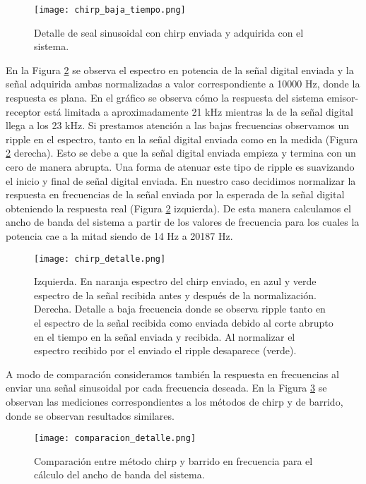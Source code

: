 \documentclass[a4paper, 11pt]{article}
\begin{document}
\begin{figure} [H]
\centering
\texttt{[image: chirp\_baja\_tiempo.png]}
\caption{Detalle de seal sinusoidal con chirp enviada y adquirida con el sistema.\label{fig:chirp}}
\end{figure}
En la Figura \ref{fig:chirp_detalle} se observa el espectro en potencia de la señal digital enviada y la señal adquirida ambas normalizadas a valor correspondiente a 10000 Hz, donde la respuesta es plana. En el gráfico se observa cómo la respuesta del sistema emisor-receptor está limitada a aproximadamente 21 kHz mientras la de la señal digital llega a los 23 kHz. Si prestamos atención a las bajas frecuencias observamos un ripple en el espectro, tanto en la señal digital enviada como en la medida (Figura \ref{fig:chirp_detalle} derecha). Esto se debe a que la señal digital enviada empieza y termina con un cero de manera abrupta. Una forma de atenuar este tipo de ripple es suavizando el inicio y final de señal digital enviada. En nuestro caso decidimos normalizar la respuesta en frecuencias de la señal enviada por la esperada de la señal digital obteniendo la respuesta real (Figura \ref{fig:chirp_detalle} izquierda). De esta manera calculamos el ancho de banda del sistema a partir de los valores de frecuencia para los cuales la potencia cae a la mitad siendo de 14 Hz a 20187 Hz.

\begin{figure} [H]
\centering
\texttt{[image: chirp\_detalle.png]}
\caption{Izquierda. En naranja espectro del chirp enviado, en azul y verde espectro de la señal recibida antes y después de la normalización. Derecha. Detalle a baja frecuencia donde se observa ripple tanto en el espectro de la señal recibida como enviada debido al corte abrupto en el tiempo en la señal enviada y recibida. Al normalizar el espectro recibido por el enviado el ripple desaparece (verde).   \label{fig:chirp_detalle}}
\end{figure}

A modo de comparación consideramos también la respuesta en frecuencias al enviar una señal sinusoidal por cada frecuencia deseada. En la Figura \ref{fig:comparacionancho} se observan las mediciones correspondientes a los métodos de chirp y de barrido, donde se observan resultados similares. 

\begin{figure} [H]
\centering
\texttt{[image: comparacion\_detalle.png]}
\caption{Comparación entre método chirp y barrido en frecuencia para el cálculo del ancho de banda del sistema.\label{fig:comparacionancho}}
\end{figure} 
\end{document}
